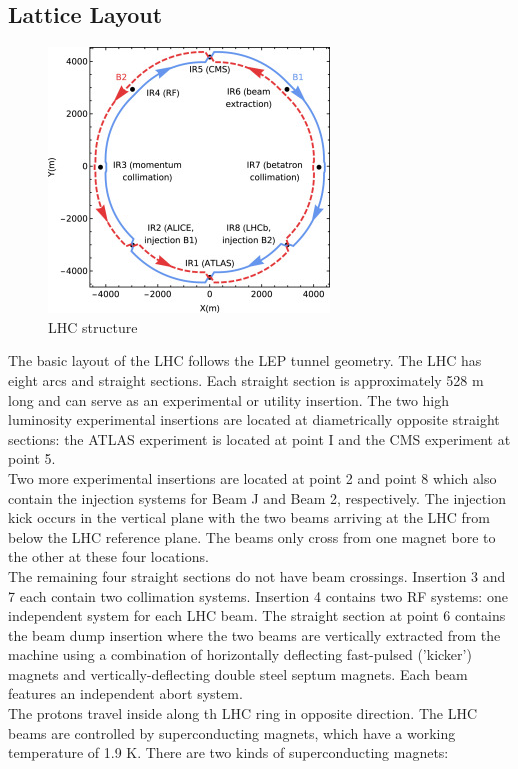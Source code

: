 \documentclass[a4paper, oneside]{book}
\begin{document}
			\subsection{Lattice Layout}
			\begin{figure}
				\centering
				\includegraphics[width=0.3\textheight]{tesi_images/LHC_structure.jpg}
				\caption{LHC structure}
			\end{figure}
			The basic layout of the LHC follows the LEP tunnel geometry. The LHC has eight arcs and straight sections. Each straight section is approximately 528 m long and can serve as an experimental or utility insertion. The two high luminosity experimental insertions are located at diametrically opposite straight sections: the ATLAS experiment is located at point I and the CMS experiment at point 5.\\
			Two more experimental insertions are located at point 2 and point 8 which also contain the injection systems for Beam
			J and Beam 2, respectively. The injection kick occurs in the vertical plane with the two beams arriving at the LHC from below the LHC reference plane. The beams only cross from one magnet bore to the other at
			these four locations.\\
			The remaining four straight sections do not have beam crossings. Insertion 3 and 7 each contain two collimation systems. Insertion 4 contains two RF systems: one independent system for each LHC
			beam. The straight section at point 6 contains the beam dump insertion where the two beams are vertically
			extracted from the machine using a combination of horizontally deflecting fast-pulsed ('kicker') magnets and
			vertically-deflecting double steel septum magnets. Each beam features an independent abort system. \cite{LHC design} \\
			The protons travel inside along th LHC ring in opposite direction. The LHC beams are controlled by superconducting magnets, which have a working temperature of 1.9 K. There are two kinds of superconducting magnets: \\
\end{document}
